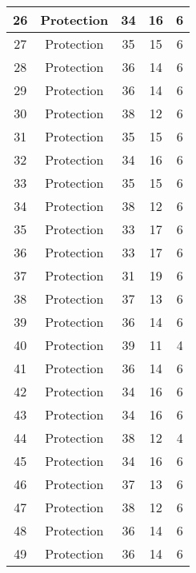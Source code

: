 \documentclass[results.tex]{subfiles}
\begin{document}
\begin{center}
\begin{tabular}{| c || c | c | c | c |}
    \hline
    26 & Protection & 34 & 16 & 6 \\ 
    \hline
    27 & Protection & 35 & 15 & 6 \\ 
    \hline
    28 & Protection & 36 & 14 & 6 \\ 
    \hline
    29 & Protection & 36 & 14 & 6 \\ 
    \hline
    30 & Protection & 38 & 12 & 6 \\ 
    \hline
    31 & Protection & 35 & 15 & 6 \\ 
    \hline
    32 & Protection & 34 & 16 & 6 \\ 
    \hline
    33 & Protection & 35 & 15 & 6 \\ 
    \hline
    34 & Protection & 38 & 12 & 6 \\ 
    \hline
    35 & Protection & 33 & 17 & 6 \\ 
    \hline
    36 & Protection & 33 & 17 & 6 \\ 
    \hline
    37 & Protection & 31 & 19 & 6 \\ 
    \hline
    38 & Protection & 37 & 13 & 6 \\ 
    \hline
    39 & Protection & 36 & 14 & 6 \\ 
    \hline
    40 & Protection & 39 & 11 & 4 \\ 
    \hline
    41 & Protection & 36 & 14 & 6 \\ 
    \hline
    42 & Protection & 34 & 16 & 6 \\ 
    \hline
    43 & Protection & 34 & 16 & 6 \\ 
    \hline
    44 & Protection & 38 & 12 & 4 \\ 
    \hline
    45 & Protection & 34 & 16 & 6 \\ 
    \hline
    46 & Protection & 37 & 13 & 6 \\ 
    \hline
    47 & Protection & 38 & 12 & 6 \\ 
    \hline
    48 & Protection & 36 & 14 & 6 \\ 
    \hline
    49 & Protection & 36 & 14 & 6 \\ 
    \hline   \end{tabular}
\end{center}
\end{document}

